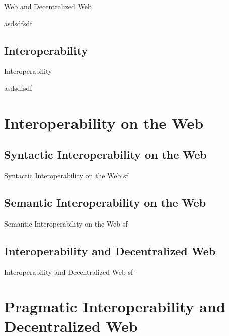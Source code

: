 \documentclass[10pt]{beamer}
\begin{document}
    \begin{frame}[fragile]{Web and Decentralized Web}

      asdsdfsdf

    \end{frame}

  \subsection{Interoperability}

    \begin{frame}[fragile]{Interoperability}

      asdsdfsdf

    \end{frame}

\section{Interoperability on the Web}

  \subsection{Syntactic Interoperability on the Web}

    \begin{frame}[fragile]{Syntactic Interoperability on the Web}
      sf
    \end{frame}

  \subsection{Semantic Interoperability on the Web}

    \begin{frame}[fragile]{Semantic Interoperability on the Web}
      sf
    \end{frame}

  \subsection{Interoperability and Decentralized Web}

    \begin{frame}[fragile]{Interoperability and Decentralized Web}
      sf
    \end{frame}

\section{Pragmatic Interoperability and Decentralized Web}
\end{document}
